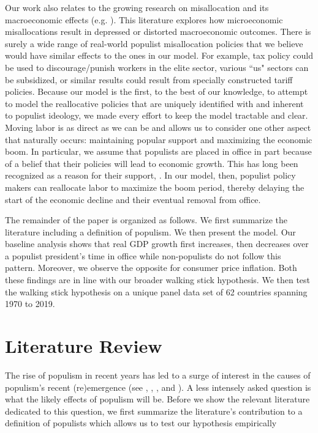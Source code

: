 \documentclass{OUP-EJ}
\begin{document}
Our work also relates to the growing research on misallocation and its macroeconomic effects (e.g. \cite{Reis2013}). This literature explores how microeconomic misallocations result in depressed or distorted macroeconomic outcomes. There is surely a wide range of real-world populist misallocation policies that we believe would have similar effects to the ones in our model. For example, tax policy could be used to discourage/punish workers in the elite sector, various ``us" sectors can be subsidized, or similar results could result from specially constructed tariff policies. Because our model is the first, to the best of our knowledge, to attempt to model the reallocative policies that are uniquely identified with and inherent to populist ideology, we made every effort to keep the model tractable and clear. Moving labor is as direct as we can be and allows us to consider one other aspect that naturally occurs: maintaining popular support and maximizing the economic boom.  In particular, we assume that populists are placed in office in part because of a belief that their policies will lead to economic growth. This has long been recognized as a reason for their support, \cite{DornbuschEdwards1990}. In our model, then, populist policy makers can reallocate labor to maximize the boom period, thereby delaying the start of the economic decline and their eventual removal from office. 

The remainder of the paper is organized as follows. We first summarize the literature including a definition of populism. We then present the model. Our baseline analysis shows that real GDP growth first increases, then decreases over a populist president’s time in office while non-populists do not follow this pattern. Moreover, we observe the opposite for consumer price inflation. Both these findings are in line with our broader walking stick hypothesis. We then test the walking stick hypothesis on a unique panel data set of 62 countries spanning 1970 to 2019. 

\section{Literature Review}

The rise of populism in recent years has led to a surge of interest in the causes of populism’s recent (re)emergence (see \cite{Inglehart2016}, \cite{Judis2016}, \cite{Margalit2019}, \cite{Rodrik2018a} and \cite{Rodrik2018b}). A less intensely asked question is what the likely effects of populism will be. Before we show the relevant literature dedicated to this question, we first summarize the literature’s contribution to a definition of populists which allows us to test our hypothesis empirically
\end{document}
